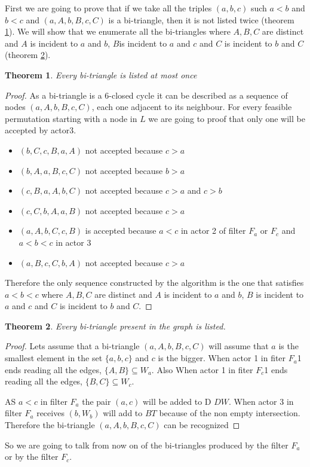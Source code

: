 \documentclass[12pt, a4paper]{article}
\newtheorem{theorem}{Theorem}
\begin{document}
First we are going to prove that if we take all the triples $(a,b,c)$  such $a<b$ and $b<c$  and    $(a,A,b,B,c,C)$ is a bi-triangle, then it is not listed twice (theorem \ref{TH-unicity}).  We will show that we  enumerate all the bi-triangles  where $A,B,C$  are distinct and $A$ is incident to $a$ and $b$, $B$is incident to $a$ and $c$ and $C$ is incident to $b$ and $C$ (theorem \ref{TH-all}). 
\begin{theorem} \label{TH-unicity}Every bi-triangle is listed at most once 

\end{theorem}
\begin{proof}
As a bi-triangle is a 6-closed cycle it can be described as a sequence of nodes  $(a,A,b,B,c,C)$, each one adjacent to its neighbour. For every feasible permutation  starting with a node in $L$ we are going to proof that only one will be accepted by actor3.  
\begin{itemize}
    \item $(b,C,c,B,a,A)$ not accepted because $c > a$
    \item $(b,A,a,B,c,C)$ not accepted because $b > a$
    \item $(c,B,a,A,b,C)$ not accepted because $c > a$ and $c > b$
    \item $(c,C,b,A,a,B)$ not accepted because $c > a  $
    \item $(a,A,b,C,c,B)$ is accepted because $a < c $ in actor 2 of filter $F_a$ or $F_c$ and $a < b <c$  in actor 3
    \item $(a,B,c,C,b,A)$ not accepted because $c > a$
\end{itemize}


Therefore the  only sequence constructed by the algorithm is the one that satisfies $a < b < c $ where $A,B,C$  are distinct and $A$ is incident to $a$ and $b$, $B$ is incident to $a$ and $c$ and $C$ is incident to $b$ and $C$.
\end{proof}


\begin{theorem}\label{TH-all}Every bi-triangle present in the graph is listed.

\end{theorem}
\begin{proof}


Lets assume that a bi-triangle $(a,A,b,B,c,C)$   will assume that $a$ is the smallest element in the set $\{a,b,c\}$ and $c$ is the bigger.
When actor 1 in fiter $F_a$1 ends reading all the edges, $\{A,B\} \subseteq W_a$. Also When actor 1 in fiter $F_c$1 ends reading all the edges, $\{B,C\} \subseteq W_c$. 

AS $a < c$  in filter $F_a$ the pair $(a,c)$  will be added to D
$DW$. When actor 3 in filter $F_a$ receives $(b, W_b)$ will add to $BT$ because of the non empty intersection. Therefore the bi-triangle $(a,A,b,B,c,C)$ can be recognized
\end{proof}
\iffalse So we are going to talk from now on of the bi-triangles produced by the filter $F_a$ or by the filter $F_c$.
\end{document}

